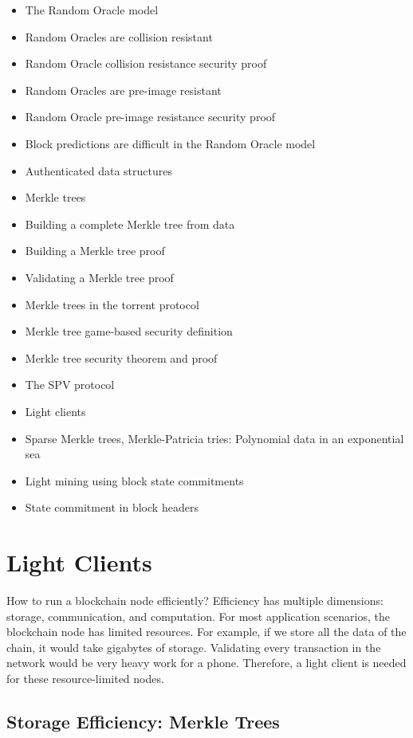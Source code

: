 {\color{red}
\begin{itemize}
\item The Random Oracle model
\item Random Oracles are collision resistant
\item Random Oracle collision resistance security proof
\item Random Oracles are pre-image resistant
\item Random Oracle pre-image resistance security proof
\item Block predictions are difficult in the Random Oracle model
\item Authenticated data structures
\item Merkle trees
\item Building a complete Merkle tree from data
\item Building a Merkle tree proof
\item Validating a Merkle tree proof
\item Merkle trees in the torrent protocol
\item Merkle tree game-based security definition
\item Merkle tree security theorem and proof
\item The SPV protocol
\item Light clients
\item Sparse Merkle trees, Merkle-Patricia tries: Polynomial data in an exponential sea
\item Light mining using block state commitments
\item State commitment in block headers
\end{itemize}
}

\section{Light Clients}

How to run a blockchain node efficiently? Efficiency has multiple dimensions: storage, communication, and computation. For most application scenarios, the blockchain node has limited resources. For example, if we store all the data of the chain, it would take gigabytes of storage. Validating every transaction in the network would be very heavy work for a phone. Therefore, a light client is needed for these resource-limited nodes.

\subsection{Storage Efficiency: Merkle Trees}

